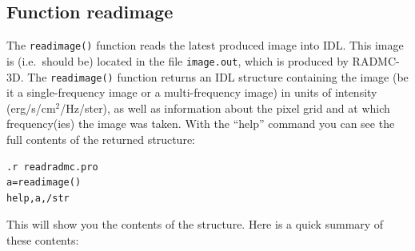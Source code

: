 \documentclass{report}
\newenvironment{asciibox}%
  {\begin{list}{}{%
    \setlength{\topsep}{0.5em}%
    \setlength{\parskip}{0em}%
    \setlength{\parsep}{0em}%
    \setlength{\itemsep}{0em}%
    \setlength{\rightmargin}{0em}%
    \setlength{\leftmargin}{3.0em}%
    \setlength{\labelsep}{1em}%
    \setlength{\labelwidth}{2em}%
  }\normalfont\footnotesize\item}
  {\end{list}}
\begin{document}
\subsection{Function readimage}
%
The {\small\tt readimage()} function reads the latest produced image into IDL.
This image is (i.e.\ should be) located in the file {\small\tt image.out}, which
is produced by RADMC-3D. The {\small\tt readimage()} function returns an IDL
structure containing the image (be it a single-frequency image or a
multi-frequency image) in units of intensity (erg/s/cm$^2$/Hz/ster), as
well as information about the pixel grid and at which frequency(ies) the
image was taken. With the ``help'' command you can see the full
contents of the returned structure:
\begin{asciibox}\begin{verbatim}
.r readradmc.pro
a=readimage()
help,a,/str
\end{verbatim}\end{asciibox}
This will show you the contents of the structure. Here is a quick summary
of these contents:
\end{document}
